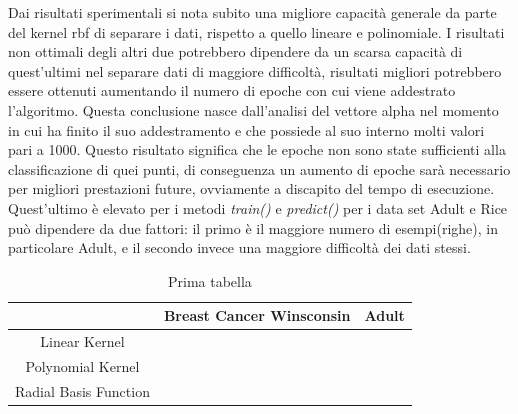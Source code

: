 \documentclass{article}
\begin{document}
    Dai risultati sperimentali si nota subito una migliore capacità generale da parte del kernel rbf di separare i dati, rispetto a quello lineare e polinomiale. I risultati non ottimali degli altri due potrebbero dipendere da un scarsa capacità di quest'ultimi nel separare dati di maggiore difficoltà, risultati migliori potrebbero essere ottenuti aumentando il numero di epoche con cui viene addestrato l'algoritmo. 
	Questa conclusione nasce dall'analisi del vettore alpha nel momento in cui ha finito il suo addestramento e che possiede al suo interno molti valori pari a 1000. Questo risultato significa che le epoche non sono state sufficienti alla classificazione di quei punti, di conseguenza un aumento di epoche sarà necessario per migliori prestazioni future, ovviamente a discapito del tempo di esecuzione.
	Quest'ultimo è elevato per i metodi \textit{train()} e \textit{predict()} per i data set Adult e Rice può dipendere da due fattori: il primo è il maggiore numero di esempi(righe), in particolare Adult, e il secondo invece una maggiore difficoltà dei dati stessi.
	\newpage
	\begin{table}[htbp]
	\centering
	\begin{tabular}{|c|c|c|}
	  \hline
	  \multicolumn{1}{|c|}{} & \multicolumn{1}{c|}{Breast Cancer Winsconsin} & \multicolumn{1}{c|}{Adult} \\
	  \hline
	  \multirow{3}{*}{Linear Kernel} & & \\
	  & & \\
	  & & \\
	  \hline
	  \multirow{3}{*}{Polynomial Kernel} & & \\
	  & & \\
	  & & \\
	  \hline
	  \multirow{3}{*}{Radial Basis Function} & & \\
	  & & \\
	  & & \\
	  \hline
	\end{tabular}
	\caption{Prima tabella}
  \end{table}
\end{document}
